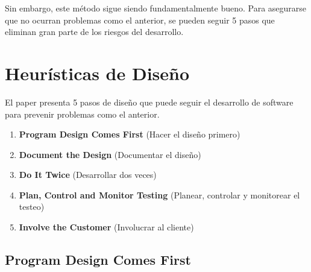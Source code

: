 \documentclass{beamer}
\begin{document}
\begin{frame}[fragile]

Sin embargo, este método sigue siendo fundamentalmente bueno. Para asegurarse que no ocurran problemas como el anterior, se pueden seguir 5 pasos que eliminan gran parte de los riesgos del desarrollo.

\end{frame}

\section{Heurísticas de Diseño}

\begin{frame}
El paper presenta 5 pasos de diseño que puede seguir el desarrollo de software para prevenir problemas como el anterior.

\begin{enumerate}
\item<2-> \textbf{Program Design Comes First} (Hacer el diseño primero)
\item<3-> \textbf{Document the Design} (Documentar el diseño)
\item<4-> \textbf{Do It Twice} (Desarrollar dos veces)
\item<5-> \textbf{Plan, Control and Monitor Testing} (Planear, controlar y monitorear el testeo)
\item<6-> \textbf{Involve the Customer} (Involucrar al cliente)
\end{enumerate}

\end{frame}

\subsection{Program Design Comes First}
\end{document}
